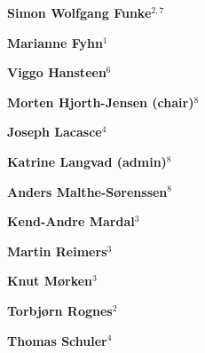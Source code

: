 \documentclass[%
oneside,                 %
final,                   %
10pt]{article}
\begin{document}
\begin{center}
{\bf Simon Wolfgang Funke${}^{2, 7}$} \\ [0mm]
\end{center}


\begin{center}
{\bf Marianne Fyhn${}^{1}$} \\ [0mm]
\end{center}


\begin{center}
{\bf Viggo Hansteen${}^{6}$} \\ [0mm]
\end{center}


\begin{center}
{\bf Morten Hjorth-Jensen (chair)${}^{8}$} \\ [0mm]
\end{center}


\begin{center}
{\bf Joseph  Lacasce${}^{4}$} \\ [0mm]
\end{center}


\begin{center}
{\bf Katrine Langvad (admin)${}^{8}$} \\ [0mm]
\end{center}


\begin{center}
{\bf Anders Malthe-Sørenssen${}^{8}$} \\ [0mm]
\end{center}


\begin{center}
{\bf Kend-Andre Mardal${}^{3}$} \\ [0mm]
\end{center}


\begin{center}
{\bf Martin Reimers${}^{3}$} \\ [0mm]
\end{center}


\begin{center}
{\bf Knut Mørken${}^{3}$} \\ [0mm]
\end{center}


\begin{center}
{\bf Torbjørn Rognes${}^{2}$} \\ [0mm]
\end{center}


\begin{center}
{\bf Thomas Schuler${}^{4}$} \\ [0mm]
\end{center}
\end{document}
